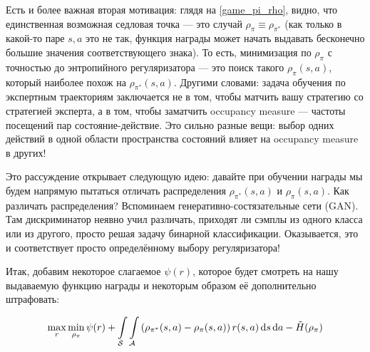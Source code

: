 Есть и более важная вторая мотивация: глядя на \eqref{game_pi_rho}, видно, что единственная возможная седловая точка --- это случай $\rho_{\pi} \equiv \rho_{\pi^*}$ (как только в какой-то паре $s, a$ это не так, функция награды может начать выдавать бесконечно большие значения соответствующего знака). То есть, минимизация по $\rho_\pi$ с точностью до энтропийного регуляризатора --- это поиск такого $\rho_\pi(s, a)$, который наиболее похож на $\rho_{\pi^*}(s, a)$. Другими словами: задача обучения по экспертным траекториям заключается не в том, чтобы матчить вашу стратегию со стратегией эксперта, а в том, чтобы заматчить occupancy measure --- частоты посещений пар состояние-действие. Это сильно разные вещи: выбор одних действий в одной области пространства состояний влияет на occupancy measure в других!

Это рассуждение открывает следующую идею: давайте при обучении награды мы будем напрямую пытаться отличать распределения $\rho_{\pi^*}(s, a)$ и $\rho_{\pi}(s, a)$. Как различать распределения? Вспоминаем генеративно-состязательные сети (GAN). Там дискриминатор неявно учил различать, приходят ли сэмплы из одного класса или из другого, просто решая задачу бинарной классификации. Оказывается, это и соответствует просто определённому выбору регуляризатора!

Итак, добавим некоторое слагаемое $\psi(r)$, которое будет смотреть на нашу выдаваемую функцию награды и некоторым образом её дополнительно штрафовать:

\begin{equation}\label{game_pi_rho_reg}
\max\limits_{r} \min\limits_{\rho_\pi} \psi(r) + \int\limits_{\mathcal{S}} \int\limits_{\mathcal{A}} \left(\rho_{\pi^*}(s, a) - \rho_\pi(s, a)\right) r(s, a) \mathop{}\!\mathrm{d} s \mathop{}\!\mathrm{d} a - \tilde{H}(\rho_\pi)
\end{equation}

